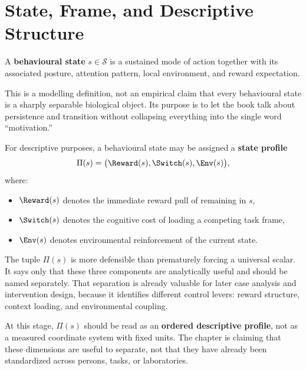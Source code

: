 \section{State, Frame, and Descriptive Structure}

\begin{definition}
A \textbf{behavioural state} $s \in \mathcal{S}$ is a sustained mode of action
together with its associated posture, attention pattern, local environment, and
reward expectation.
\end{definition}

\begin{remark}
This is a modelling definition, not an empirical claim that every behavioural
state is a sharply separable biological object. Its purpose is to let the book
talk about persistence and transition without collapsing everything into the
single word ``motivation.''
\end{remark}

\begin{definition}
For descriptive purposes, a behavioural state may be assigned a
\textbf{state profile}
\[
  \Pi(s) = \bigl(\Reward(s), \Switch(s), \Env(s)\bigr),
\]
where:
\begin{itemize}[nosep]
  \item $\Reward(s)$ denotes the immediate reward pull of remaining in $s$,
  \item $\Switch(s)$ denotes the cognitive cost of loading a competing task
        frame,
  \item $\Env(s)$ denotes environmental reinforcement of the current state.
\end{itemize}
\end{definition}

\begin{discussion}
The tuple $\Pi(s)$ is more defensible than prematurely forcing a universal
scalar. It says only that these three components are analytically useful and
should be named separately. That separation is already valuable for later case
analysis and intervention design, because it identifies different control
levers: reward structure, context loading, and environmental coupling.
\end{discussion}

\begin{remark}
At this stage, $\Pi(s)$ should be read as an \textbf{ordered descriptive
profile}, not as a measured coordinate system with fixed units. The chapter is
claiming that these dimensions are useful to separate, not that they have
already been standardized across persons, tasks, or laboratories.
\end{remark}
